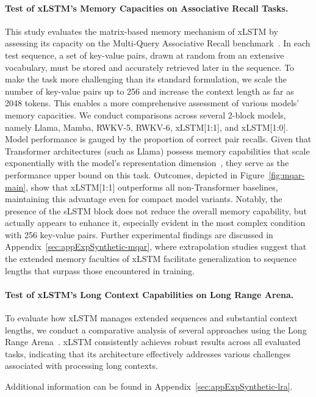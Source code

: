 \paragraph{Test of xLSTM's Memory Capacities on Associative Recall Tasks.} This study evaluates the matrix-based memory mechanism of xLSTM by assessing its capacity on the Multi-Query Associative Recall benchmark~\citep{Arora:23arxiv}. In each test sequence, a set of key-value pairs, drawn at random from an extensive vocabulary, must be stored and accurately retrieved later in the sequence. To make the task more challenging than its standard formulation, we scale the number of key-value pairs up to 256 and increase the context length as far as 2048 tokens. This enables a more comprehensive assessment of various models' memory capacities. We conduct comparisons across several 2-block models, namely Llama, Mamba, RWKV-5, RWKV-6, xLSTM[1:1], and xLSTM[1:0]. Model performance is gauged by the proportion of correct pair recalls. Given that Transformer architectures (such as Llama) possess memory capabilities that scale exponentially with the model's representation dimension~\citep{Ramsauer:21}, they serve as the performance upper bound on this task. Outcomes, depicted in Figure~\ref{fig:mqar-main}, show that xLSTM[1:1] outperforms all non-Transformer baselines, maintaining this advantage even for compact model variants. Notably, the presence of the sLSTM block does not reduce the overall memory capability, but actually appears to enhance it, especially evident in the most complex condition with 256 key-value pairs. Further experimental findings are discussed in Appendix~\ref{sec:appExpSynthetic-mqar}, where extrapolation studies suggest that the extended memory faculties of xLSTM facilitate generalization to sequence lengths that surpass those encountered in training.

\paragraph{Test of xLSTM's Long Context Capabilities on Long Range Arena.} To evaluate how xLSTM manages extended sequences and substantial context lengths, we conduct a comparative analysis of several approaches using the Long Range Arena~\citep{Tay:21}. xLSTM consistently achieves robust results across all evaluated tasks, indicating that its architecture effectively addresses various challenges associated with processing long contexts.

Additional information can be found in Appendix~\ref{sec:appExpSynthetic-lra}.

